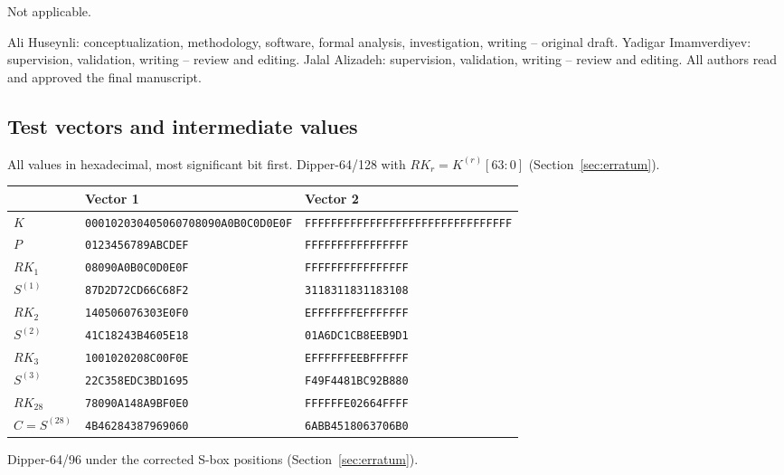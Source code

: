 \documentclass[pdflatex,sn-mathphys-num]{sn-jnl}
\theoremstyle{thmstyleone}
\theoremstyle{thmstylethree}
\theoremstyle{thmstyletwo}
\begin{document}
Not applicable.

Ali Huseynli: conceptualization, methodology, software, formal analysis, investigation, writing -- original draft. Yadigar Imamverdiyev: supervision, validation, writing -- review and editing. Jalal Alizadeh: supervision, validation, writing -- review and editing. All authors read and approved the final manuscript.

\begin{appendices}

\section{Test vectors and intermediate values}\label{app:tv}
All values in hexadecimal, most significant bit first. Dipper-64/128 with $RK_r=K^{(r)}[63{:}0]$ (Section~\ref{sec:erratum}).

\begin{center}\footnotesize
\begin{tabular}{lll}
\toprule
 & Vector 1 & Vector 2\\
\midrule
$K$ & \texttt{000102030405060708090A0B0C0D0E0F} & \texttt{FFFFFFFFFFFFFFFFFFFFFFFFFFFFFFFF}\\
$P$ & \texttt{0123456789ABCDEF} & \texttt{FFFFFFFFFFFFFFFF}\\
$RK_1$ & \texttt{08090A0B0C0D0E0F} & \texttt{FFFFFFFFFFFFFFFF}\\
$S^{(1)}$ & \texttt{87D2D72CD66C68F2} & \texttt{3118311831183108}\\
$RK_2$ & \texttt{140506076303E0F0} & \texttt{EFFFFFFFEFFFFFFF}\\
$S^{(2)}$ & \texttt{41C18243B4605E18} & \texttt{01A6DC1CB8EEB9D1}\\
$RK_3$ & \texttt{1001020208C00F0E} & \texttt{EFFFFFFEEBFFFFFF}\\
$S^{(3)}$ & \texttt{22C358EDC3BD1695} & \texttt{F49F4481BC92B880}\\
$RK_{28}$ & \texttt{78090A148A9BF0E0} & \texttt{FFFFFFE02664FFFF}\\
$C=S^{(28)}$ & \texttt{4B46284387969060} & \texttt{6ABB4518063706B0}\\
\bottomrule
\end{tabular}
\end{center}

\medskip\noindent Dipper-64/96 under the corrected S-box positions (Section~\ref{sec:erratum}).


\end{appendices}
\end{document}
